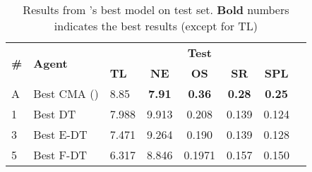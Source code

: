 \begin{table*}

\caption{\label{table:f_dt_test_final} Results from \citet{VLNCE}'s best model on test set. \textbf{Bold} numbers indicates the best results (except for TL)}
\renewcommand{\arraystretch}{1.2}
\centering
\small\addtolength{\tabcolsep}{-2.3pt}
\begin{tabular}{@{}lllccccc@{}}
\toprule
   \multirow{2}{*}{\textbf{\#}}
  & \multirow{2}{*}{\textbf{Agent}}
  & \multicolumn{5}{c}{\textbf{Test}} \\
  \cmidrule(l){3-7}
  & & \textbf{TL} & \textbf{NE} & \textbf{OS} & \textbf{SR} & \textbf{SPL} \\
\midrule
A & Best CMA (\citet{VLNCE})  & 8.85 & \textbf{7.91} & \textbf{0.36} & \textbf{0.28} & \textbf{0.25}  \\
\midrule
1 & Best DT  & 7.988 & 	9.913 & 0.208 & 0.139 & 0.124  \\
\midrule
3 & Best E-DT  & 7.471 & 	9.264 & 0.190 & 0.139 & 0.128  \\
\midrule
5 & Best F-DT  & 	6.317 & 		8.846 & 0.1971 & 0.157 & 0.150  \\

\bottomrule
\end{tabular}
\end{table*}
